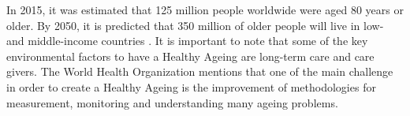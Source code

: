 \documentclass[12pt,journal,onecolumn,compsoc]{IEEEtran}
\begin{document}
\maketitle


\IEEEdisplaynontitleabstractindextext

\IEEEpeerreviewmaketitle







In 2015, it was estimated that 125 million people worldwide were aged 80 years or older.
By 2050, it is predicted that 350 million of older people will live in low- and middle-income countries \cite{AH16}. 
It is important to note that some of the key environmental factors to have a Healthy Ageing are
long-term care and care givers.
The World Health Organization mentions 
that one of the main challenge in order to create a Healthy Ageing
is the improvement of methodologies for measurement, monitoring and understanding 
many ageing problems.


\end{document}
